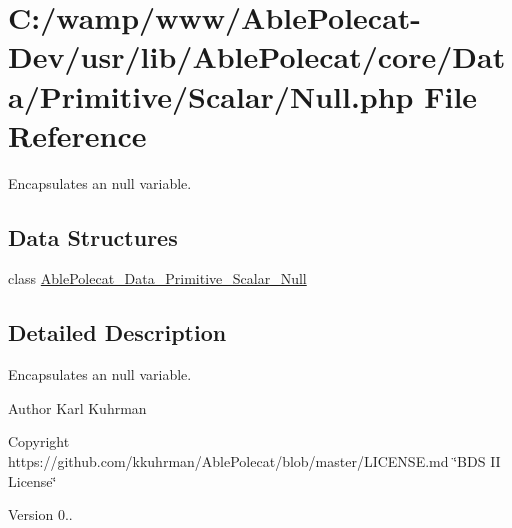 \hypertarget{_null_8php}{}\section{C\+:/wamp/www/\+Able\+Polecat-\/\+Dev/usr/lib/\+Able\+Polecat/core/\+Data/\+Primitive/\+Scalar/\+Null.php File Reference}
\label{_null_8php}


Encapsulates an null variable.  


\subsection*{Data Structures}
\begin{DoxyCompactItemize}
\item 
class \hyperlink{class_able_polecat___data___primitive___scalar___null}{Able\+Polecat\+\_\+\+Data\+\_\+\+Primitive\+\_\+\+Scalar\+\_\+\+Null}
\end{DoxyCompactItemize}


\subsection{Detailed Description}
Encapsulates an null variable. 

\begin{DoxyAuthor}{Author}
Karl Kuhrman 
\end{DoxyAuthor}
\begin{DoxyCopyright}{Copyright}
https\+://github.com/kkuhrman/\+Able\+Polecat/blob/master/\+L\+I\+C\+E\+N\+S\+E.\+md \char`\"{}\+B\+D\+S I\+I License\char`\"{} 
\end{DoxyCopyright}
\begin{DoxyVersion}{Version}
0.. 
\end{DoxyVersion}
